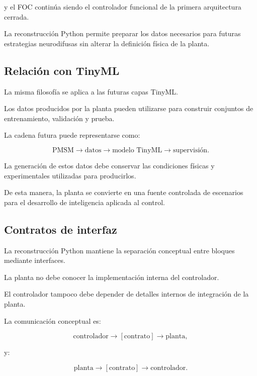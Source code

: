 y el FOC continúa siendo el controlador funcional de la primera arquitectura cerrada.

La reconstrucción Python permite preparar los datos necesarios para futuras estrategias neurodifusas sin alterar la definición física de la planta.

\subsection{Relación con TinyML}

La misma filosofía se aplica a las futuras capas TinyML.

Los datos producidos por la planta pueden utilizarse para construir conjuntos de entrenamiento, validación y prueba.

La cadena futura puede representarse como:

\begin{equation}
\text{PMSM}
\rightarrow
\text{datos}
\rightarrow
\text{modelo TinyML}
\rightarrow
\text{supervisión}.
\end{equation}

La generación de estos datos debe conservar las condiciones físicas y experimentales utilizadas para producirlos.

De esta manera, la planta se convierte en una fuente controlada de escenarios para el desarrollo de inteligencia aplicada al control.

\subsection{Contratos de interfaz}

La reconstrucción Python mantiene la separación conceptual entre bloques mediante interfaces.

La planta no debe conocer la implementación interna del controlador.

El controlador tampoco debe depender de detalles internos de integración de la planta.

La comunicación conceptual es:

\begin{equation}
\text{controlador}
\rightarrow
[\text{contrato}]
\rightarrow
\text{planta},
\end{equation}

y:

\begin{equation}
\text{planta}
\rightarrow
[\text{contrato}]
\rightarrow
\text{controlador}.
\end{equation}


